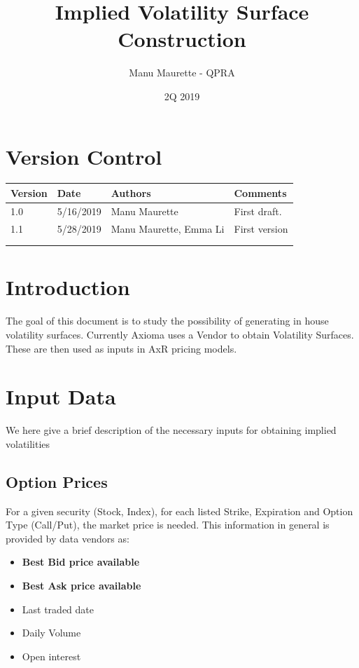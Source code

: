 \documentclass[11pt,confidential]{article}
\title{Implied Volatility Surface Construction}
\author{Manu Maurette - QPRA}
\date{2Q 2019}
\begin{document}
	\maketitle

\newpage

\vspace*{\fill}
\section*{Version Control}

\begin{center}
    \begin{tabular}{ | l | l | l| p{8cm} |}
    \hline
   Version & Date       & Authors       & Comments      \\ \hline
    1.0    & 5/16/2019  & Manu Maurette & First draft.  \\ \hline
		1.1    & 5/28/2019  & Manu Maurette, Emma Li & First version  \\ \hline
           &            &               &               \\ \hline
			     &            &               &               \\ 
					\hline
    \end{tabular}
\end{center}


\pagebreak


\section{Introduction}

The goal of this document is to study the possibility of generating in house volatility surfaces. Currently Axioma uses a Vendor to obtain Volatility Surfaces. These are then used as inputs in AxR pricing models.


\section{Input Data}

We here give a brief description of the necessary inputs for obtaining implied volatilities

\subsection{Option Prices}

For a given security (Stock, Index), for each listed Strike, Expiration and Option Type (Call/Put), the market price is needed. This information in general is provided by data vendors as:
\begin{itemize}
\item \textbf{Best Bid price available}
\item \textbf{Best Ask price available}
\item Last traded date
\item Daily Volume
\item Open interest
\end{itemize}
 
\end{document}
